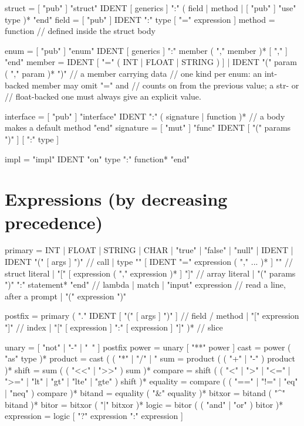 \begin{shell}
struct      = [ "pub" ] "struct" IDENT [ generics ] ":"
                  ( field | method | [ "pub" ] "use" type )*
              "end"
field       = [ "pub" ] IDENT ":" type [ "=" expression ]
method      = function                       // defined inside the struct body

enum        = [ "pub" ] "enum" IDENT [ generics ] ":"
                  member ( "," member )* [ "," ]
              "end"
member      = IDENT [ "=" ( INT | FLOAT | STRING ) ]
            | IDENT "(" param ( "," param )* ")"  // a member carrying data
              // one kind per enum: an int-backed member may omit "=" and
              // counts on from the previous value; a str- or
              // float-backed one must always give an explicit value.

interface   = [ "pub" ] "interface" IDENT ":"
                  ( signature | function )*  // a body makes a default method
              "end"
signature   = [ "mut" ] "func" IDENT [ "(" params ")" ] [ ":" type ]

impl        = "impl" IDENT "on" type ":" function* "end"
\end{shell}

\section*{Expressions (by decreasing precedence)}

\begin{shell}
primary     = INT | FLOAT | STRING | CHAR | "true" | "false" | "null"
            | IDENT
            | IDENT "(" [ args ] ")"             // call
            | type "{" [ IDENT "=" expression ( "," ... )* ] "}"  // struct literal
            | "[" [ expression ( "," expression )* ] "]"          // array literal
            | "(" params ")" ":" statement* "end"                 // lambda
            | match
            | "input" expression                 // read a line, after a prompt
            | "(" expression ")"

postfix     = primary ( "." IDENT [ "(" [ args ] ")" ]   // field / method
                      | "[" expression "]"               // index
                      | "[" [ expression ] ":" [ expression ] "]" )*  // slice

unary       = [ "not" | "-" | "~" ] postfix
power       = unary [ "**" power ]
cast        = power ( "as" type )*
product     = cast ( ( "*" | "/" | "%
sum         = product ( ( "+" | "-" ) product )*
shift       = sum ( ( "<<" | ">>" ) sum )*
compare     = shift ( ( "<" | ">" | "<=" | ">=" | "lt" | "gt" | "lte" | "gte" ) shift )*
equality    = compare ( ( "==" | "!=" | "eq" | "neq" ) compare )*
bitand      = equality ( "&" equality )*
bitxor      = bitand ( "^" bitand )*
bitor       = bitxor ( "|" bitxor )*
logic       = bitor ( ( "and" | "or" ) bitor )*
expression  = logic [ "?" expression ":" expression ]
\end{shell}

